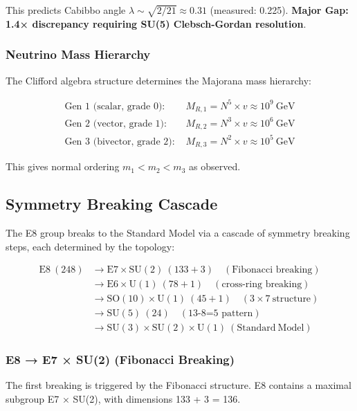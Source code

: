 \documentclass[12pt,a4paper]{article}
\begin{document}
This predicts Cabibbo angle $\lambda \sim \sqrt{2/21} \approx 0.31$ (measured: 0.225). \textbf{Major Gap: 1.4× discrepancy requiring SU(5) Clebsch-Gordan resolution}.

\subsubsection{Neutrino Mass Hierarchy}
The Clifford algebra structure determines the Majorana mass hierarchy:

\begin{align}
\text{Gen 1 (scalar, grade 0): } &M_{R,1} = N^5 \times v \approx 10^9\ \text{GeV} \\
\text{Gen 2 (vector, grade 1): } &M_{R,2} = N^3 \times v \approx 10^6\ \text{GeV} \\
\text{Gen 3 (bivector, grade 2): } &M_{R,3} = N^2 \times v \approx 10^5\ \text{GeV}
\end{align}

This gives normal ordering $m_1 < m_2 < m_3$ as observed.

\subsection{Symmetry Breaking Cascade}

The E8 group breaks to the Standard Model via a cascade of symmetry breaking steps, each determined by the topology:

\begin{align*}
\mathrm{E8\ (248)} &\rightarrow \mathrm{E7 \times SU(2)}\ (133 + 3) \quad (\text{Fibonacci breaking}) \\
&\rightarrow \mathrm{E6 \times U(1)}\ (78 + 1) \quad (\text{cross-ring breaking}) \\
&\rightarrow \mathrm{SO(10) \times U(1)}\ (45 + 1) \quad (3\times7\ \text{structure}) \\
&\rightarrow \mathrm{SU(5)}\ (24) \quad (\text{13-8=5 pattern}) \\
&\rightarrow \mathrm{SU(3) \times SU(2) \times U(1)}\ (\mathrm{Standard\ Model})
\end{align*}

\subsubsection{E8 → E7 × SU(2) (Fibonacci Breaking)}
The first breaking is triggered by the Fibonacci structure. E8 contains a maximal subgroup E7 × SU(2), with dimensions 133 + 3 = 136.
\end{document}
